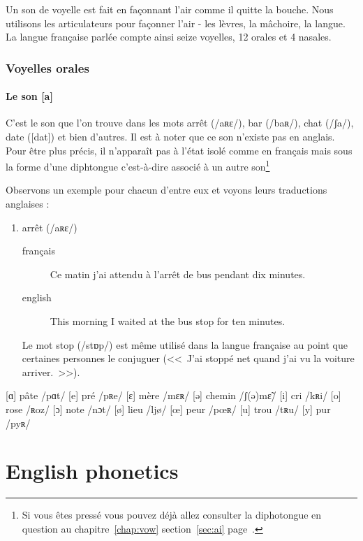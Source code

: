 \documentclass[12pt,a4paper]{book}
\begin{document}
Un son de voyelle est fait en façonnant l'air comme il quitte la
bouche. Nous utilisons les articulateurs pour façonner l'air - les
lèvres, la mâchoire, la langue. La langue française parlée compte
ainsi seize voyelles, 12 orales et 4 nasales.

\section{Voyelles orales}\label{sec:orales}
\subsection{Le son [a]}\label{subsec:afr}

C'est le son que l'on trouve dans les mots arrêt (/aʀɛ/), bar (/baʀ/),
chat (/ʃa/), date ([dat]) et bien d'autres. Il est à noter que ce son
n'existe pas en anglais. Pour être plus précis, il n'apparaît pas à
l'état isolé comme en français mais sous la forme d'une diphtongue
c'est-à-dire associé à un autre son\footnote{Si vous êtes pressé vous
  pouvez déjà allez consulter la diphotongue en question au
  chapitre~\ref{chap:vow} section~\ref{sec:ai} page~\pageref{sec:ai}. }

Observons un exemple pour chacun d'entre eux et voyons leurs
traductions anglaises :
\begin{enumerate}
\item arrêt (/aʀɛ/)
  \begin{description}
  \item[{français}] \begin{cursive}Ce matin j'ai attendu à l'arrêt de
      bus pendant dix  minutes.\end{cursive}
    \item[{english}] \textenglish{This morning I waited at the bus stop for ten minutes.}
    \end{description}
    Le mot stop (/stɒp/) est même utilisé dans la langue française au
    point que certaines personnes le conjuguer (<<~J'ai stoppé net
    quand j'ai vu la voiture arriver.~>>).
\end{enumerate}


        [ɑ] pâte /pɑt/
        [e] pré /pʀe/
        [ɛ] mère /mɛʀ/
        [ə] chemin /ʃ(ə)mɛ̃/
        [i] cri /kʀi/
        [o] rose /ʀoz/
        [ɔ] note /nɔt/
        [ø] lieu /ljø/
        [œ] peur /pœʀ/
        [u] trou /tʀu/
        [y] pur /pyʀ/


\part{\textenglish{English phonetics}}
\end{document}
